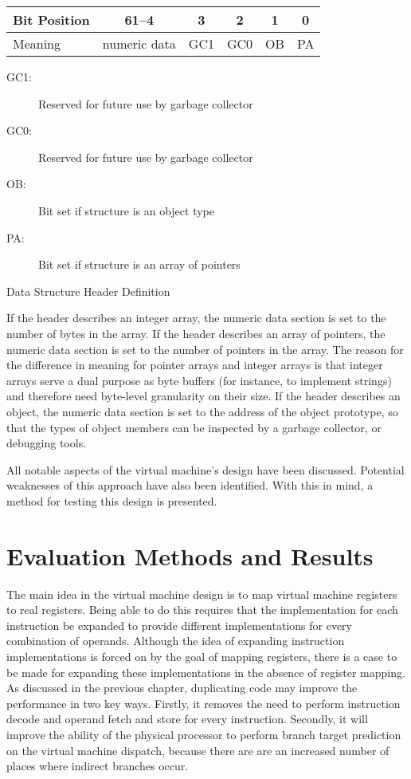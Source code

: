 		\begin{myfigure}
			\begin{tabular}{|l|c| c| c|c|c|}
				\hline
				Bit Position & 61--4 & 3 & 2 & 1 & 0 \\
				\hline
				Meaning & numeric data & GC1 & GC0 & OB & PA \\
				\hline
			\end{tabular}
			\newline
			\begin{description}
				\item[GC1:] Reserved for future use by garbage collector
				\item[GC0:] Reserved for future use by garbage collector
				\item[OB:] Bit set if structure is an object type
				\item[PA:] Bit set if structure is an array of pointers
			\end{description}
			
			\caption{Data Structure Header Definition}
			\label{fig:objheader}
		\end{myfigure}
		
		If the header describes an integer array, the numeric data section is set to the number of bytes in the array. If the header describes an array of pointers, the numeric data section is set to the number of pointers in the array. The reason for the difference in meaning for pointer arrays and integer arrays is that integer arrays serve a dual purpose as byte buffers (for instance, to implement strings) and therefore need byte-level granularity on their size. If the header describes an object, the numeric data section is set to the address of the object prototype, so that the types of object members can be inspected by a garbage collector, or debugging tools.
		
		All notable aspects of the virtual machine's design have been discussed. Potential weaknesses of this approach have also been identified. With this in mind, a method for testing this design is presented.

\chapter{Evaluation Methods and Results}
	The main idea in the virtual machine design is to map virtual machine registers to real registers. Being able to do this requires that the implementation for each instruction be expanded to provide different implementations for every combination of operands. Although the idea of expanding instruction implementations is forced on by the goal of mapping registers, there is a case to be made for expanding these implementations in the absence of register mapping. As discussed in the previous chapter, duplicating code may improve the performance in two key ways. Firstly, it removes the need to perform instruction decode and operand fetch and store for every instruction. Secondly, it will improve the ability of the physical processor to perform branch target prediction on the virtual machine dispatch, because there are are an increased number of places where indirect branches occur.
	
